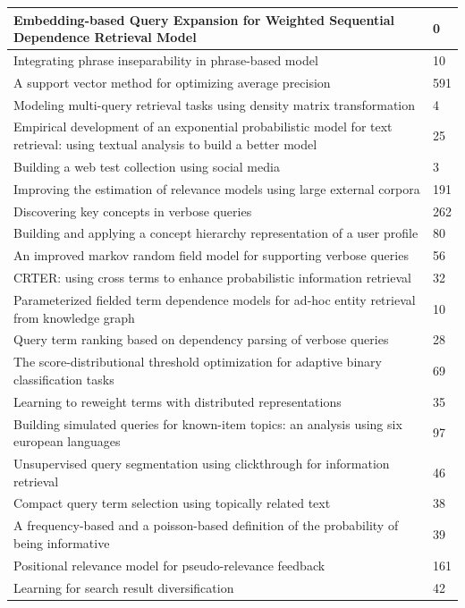 \documentclass[letterpaper,11pt]{article}
\begin{document}
\begin{center}
\begin{longtable}{|*2{p{3.5cm}| }}
Embedding-based Query Expansion for Weighted Sequential Dependence Retrieval Model & 0 \\ \hline
Integrating phrase inseparability in phrase-based model & 10 \\ \hline
A support vector method for optimizing average precision & 591 \\ \hline
Modeling multi-query retrieval tasks using density matrix transformation & 4 \\ \hline
Empirical development of an exponential probabilistic model for text retrieval: using textual analysis to build a better model & 25 \\ \hline
Building a web test collection using social media & 3 \\ \hline
Improving the estimation of relevance models using large external corpora & 191 \\ \hline
Discovering key concepts in verbose queries & 262 \\ \hline
Building and applying a concept hierarchy representation of a user profile & 80 \\ \hline
An improved markov random field model for supporting verbose queries & 56 \\ \hline
CRTER: using cross terms to enhance probabilistic information retrieval & 32 \\ \hline
Parameterized fielded term dependence models for ad-hoc entity retrieval from knowledge graph & 10 \\ \hline
Query term ranking based on dependency parsing of verbose queries & 28 \\ \hline
The score-distributional threshold optimization for adaptive binary classification tasks & 69 \\ \hline
Learning to reweight terms with distributed representations & 35 \\ \hline
Building simulated queries for known-item topics: an analysis using six european languages & 97 \\ \hline
Unsupervised query segmentation using clickthrough for information retrieval & 46 \\ \hline
Compact query term selection using topically related text & 38 \\ \hline
A frequency-based and a poisson-based definition of the probability of being informative & 39 \\ \hline
Positional relevance model for pseudo-relevance feedback & 161 \\ \hline
Learning for search result diversification & 42 \\ \hline

\end{longtable}
\end{center}
\end{document}
